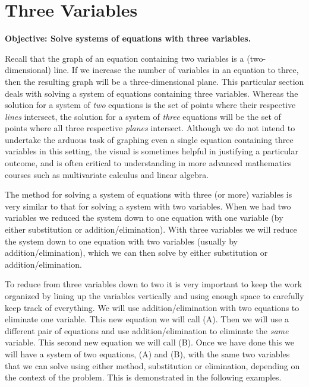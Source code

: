 \documentclass[12pt]{book}
\theoremstyle{definition}
\begin{document}
\section{Three Variables}
{\bf Objective: Solve systems of equations with three variables.}\par
Recall that the graph of an equation containing two variables is a (two-dimensional) line.  If we increase the number of variables in an equation to three, then the resulting graph will be a three-dimensional plane.  This particular section deals with solving a system of equations containing three variables.  Whereas the solution for a system of \textit{two} equations is the set of points where their respective \textit{lines} intersect, the solution for a system of \textit{three} equations will be the set of points where all three respective \textit{planes} intersect.  Although we do not intend to undertake the arduous task of graphing even a single equation containing three variables in this setting, the visual is sometimes helpful in justifying a particular outcome, and is often critical to understanding in more advanced mathematics courses such as multivariate calculus and linear algebra.\par
The method for solving a system of equations with three (or more) variables is very similar to that for solving a system with two variables. When we had two variables we reduced the system down to one equation with one variable (by either substitution or addition/elimination). With three variables we will reduce the system down to one equation with two variables (usually by addition/elimination), which we can then solve by either substitution or addition/elimination.\par
To reduce from three variables down to two it is very important to keep the work organized by lining up the variables vertically and using enough space to carefully keep track of everything. We will use addition/elimination with two equations to eliminate one variable. This new equation we will call (A). Then we will use a different pair of equations and use addition/elimination to eliminate the {\it same} variable. This second new equation we will call (B). Once we have done this we will have a system of two equations, (A) and (B), with the same two variables that we can solve using either method, substitution or elimination, depending on the context of the problem. This is demonstrated in the following examples.
\end{document}
